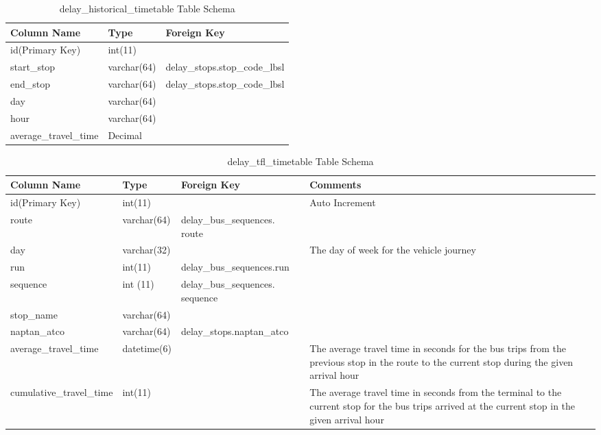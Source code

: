 \begin{appendices}
\begin{table}
\centering
\begin{tabular}{@{}lll@{}} \toprule
Column Name & Type & Foreign Key\\ \midrule
id(Primary Key) & int(11)  \\
start\_stop & varchar(64) & delay\_stops.stop\_code\_lbsl\\
end\_stop & varchar(64) & delay\_stops.stop\_code\_lbsl\\
day & varchar(64) \\
hour & varchar(64) \\
average\_travel\_time & Decimal \\ \bottomrule
\end{tabular}
\caption{delay\_historical\_timetable Table Schema}
\label{table:delay_historical_timetable}
\end{table}



\begin{table}
\centering
\begin{tabular}{@{}llp{4cm}p{4cm}@{}} \toprule
Column Name & Type & Foreign Key & Comments\\ \midrule
id(Primary Key) & int(11) & & Auto Increment\\ [0.4cm]
route & varchar(64) & delay\_bus\_sequences. route \\ [0.4cm]
day & varchar(32) & & The day of week for the vehicle journey \\ [0.4cm]
run & int(11) & delay\_bus\_sequences.run \\ [0.4cm]
sequence & int (11) & delay\_bus\_sequences. sequence \\ [0.4cm]
stop\_name & varchar(64) &  \\ [0.4cm]
naptan\_atco & varchar(64) & delay\_stops.naptan\_atco \\ [0.4cm]
average\_travel\_time & datetime(6) & & The average travel time in seconds for the bus trips from the previous stop in the route to the current stop during the given arrival hour \\ [0.4cm]
cumulative\_travel\_time & int(11) & & The average travel time in seconds from the terminal to the current stop for the bus trips arrived at the current stop in the given arrival hour \\
\bottomrule
\end{tabular}
\caption{delay\_tfl\_timetable Table Schema}
\label{table:delay_tfl_timetable}
\end{table}
\end{appendices}
